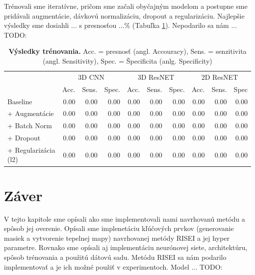 Trénovali sme iteratívne, pričom sme začali obyčajným modelom a postupne sme pridávali augmentácie, dávkovú normalizáciu, dropout a regularizáciu. Najlepšie výsledky sme dosiahli ... s presnosťou ...\% (Tabuľka \ref{tab:model_training_results}). Nepodarilo sa nám ... TODO:

\begin{landscape}
    \begin{table}[]
    \centering
    \begin{tabular}{l|rrr|rrr|rrr|}
    \cline{2-10}
    \multirow{2}{*}{}    & \multicolumn{3}{c|}{3D CNN} & \multicolumn{3}{c|}{3D ResNET} & \multicolumn{3}{c|}{2D ResNET} \\ \cline{2-10} 
     &
      \multicolumn{1}{c|}{Acc.} &
      \multicolumn{1}{c|}{Sens.} &
      \multicolumn{1}{c|}{Spec.} &
      \multicolumn{1}{c|}{Acc.} &
      \multicolumn{1}{c|}{Sens.} &
      \multicolumn{1}{c|}{Spec.} &
      \multicolumn{1}{c|}{Acc.} &
      \multicolumn{1}{c|}{Sens.} &
      \multicolumn{1}{c|}{Spec} \\ \hline
    Baseline             & 0.00    & 0.00    & 0.00    & 0.00     & 0.00     & 0.00     & 0.00     & 0.00     & 0.00     \\
    + Augmentácie        & 0.00    & 0.00    & 0.00    & 0.00     & 0.00     & 0.00     & 0.00     & 0.00     & 0.00     \\
    + Batch Norm         & 0.00    & 0.00    & 0.00    & 0.00     & 0.00     & 0.00     & 0.00     & 0.00     & 0.00     \\
    + Dropout            & 0.00    & 0.00    & 0.00    & 0.00     & 0.00     & 0.00     & 0.00     & 0.00     & 0.00     \\
    + Regularizácia (l2) & 0.00    & 0.00    & 0.00    & 0.00     & 0.00     & 0.00     & 0.00     & 0.00     & 0.00    
    \end{tabular}
    \caption{\textbf{Výsledky trénovania.} Acc. = presnosť (angl. Accouracy), Sens. = senzitivita (angl. Sensitivity), Spec. = Špecificita (anlg. Specificity)}
    \label{tab:model_training_results}
\end{table}
\end{landscape}

\section{Záver}

V tejto kapitole sme opísali ako sme implementovali nami navrhovanú metódu a spôsob jej overenie. Opísali sme implenetáciu kľúčových prvkov (generovanie masiek a vytvorenie tepelnej mapy) navrhovanej metódy RISEI a jej hyper parametre. Rovnako sme opísali aj implementáciu neurónovej siete, architektúru, spôsob trénovania a použitú dátovú sadu. Metódu RISEI sa nám podarilo implementovať a je ich možné použiť v experimentoch. Model ... TODO:
